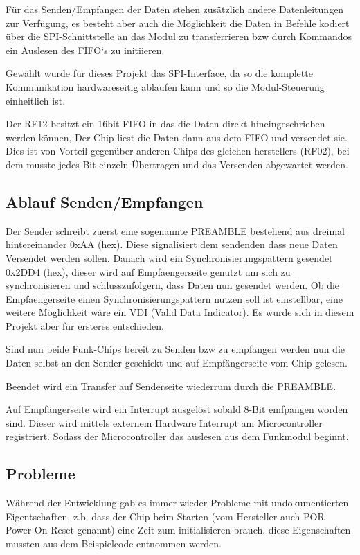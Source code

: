 \documentclass{scrartcl}
\begin{document}
		Für das Senden/Empfangen der Daten stehen zusätzlich andere Datenleitungen
		zur Verfügung, es besteht aber auch die Möglichkeit die Daten in Befehle
		kodiert über die SPI-Schnittstelle an das Modul zu transferrieren bzw
		durch Kommandos ein Auslesen des FIFO`s zu initiieren.

		Gewählt wurde für dieses Projekt das SPI-Interface, da so die komplette 
		Kommunikation hardwareseitig ablaufen kann und so die Modul-Steuerung einheitlich ist.

		Der RF12 besitzt ein 16bit FIFO in das die Daten direkt hineingeschrieben werden können,
		Der Chip liest die Daten dann aus dem FIFO und versendet sie.
		Dies ist von Vorteil gegenüber anderen Chips des gleichen herstellers (RF02), bei dem
		musste jedes Bit einzeln Übertragen und das Versenden abgewartet werden.

	\subsection{Ablauf Senden/Empfangen}
		Der Sender schreibt zuerst eine sogenannte PREAMBLE bestehend aus dreimal 
		hintereinander 0xAA (hex). Diese signalisiert dem sendenden dass neue Daten 
		Versendet werden sollen.
		Danach wird ein Synchronisierungspattern gesendet 0x2DD4 (hex), dieser wird
		auf Empfaengerseite genutzt um sich zu synchronisieren und schlusszufolgern,
		dass Daten nun gesendet werden. Ob die Empfaengerseite einen
		Synchronisierungspattern nutzen soll ist einstellbar, eine weitere Möglichkeit
		wäre ein VDI (Valid Data Indicator). Es wurde sich in diesem Projekt
		aber für ersteres entschieden.

		Sind nun beide Funk-Chips bereit zu Senden bzw zu empfangen werden nun die Daten
		selbst an den Sender geschickt und auf Empfängerseite vom Chip gelesen.

		Beendet wird ein Transfer auf Senderseite wiederrum durch die PREAMBLE.

		Auf Empfängerseite wird ein Interrupt ausgelöst sobald 8-Bit emfpangen worden sind.
		Dieser wird mittels externem Hardware Interrupt am Microcontroller registriert.
		Sodass der Microcontroller das auslesen aus dem Funkmodul beginnt.

	\subsection{Probleme}
		Während der Entwicklung gab es immer wieder Probleme mit undokumentierten Eigentschaften,
		z.b. dass der Chip beim Starten (vom Hersteller auch POR Power-On Reset genannt)
		eine Zeit zum initialisieren brauch, diese Eigenschaften mussten aus dem Beispielcode 
		entnommen werden.
		
\end{document}
